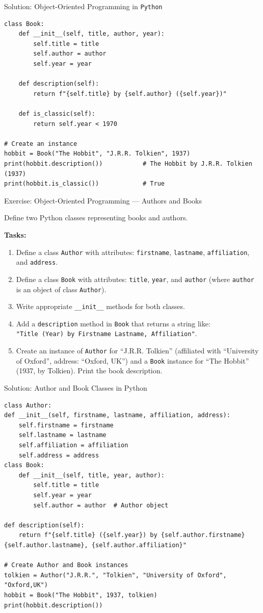 \documentclass[10pt]{beamer}
\begin{document}
\begin{frame}[fragile]{Solution: Object-Oriented Programming in \texttt{Python}}
\begin{lstlisting}[style=mypython]
class Book:
	def __init__(self, title, author, year):
		self.title = title
		self.author = author
		self.year = year

	def description(self):
		return f"{self.title} by {self.author} ({self.year})"

	def is_classic(self):
		return self.year < 1970

# Create an instance
hobbit = Book("The Hobbit", "J.R.R. Tolkien", 1937)
print(hobbit.description())           # The Hobbit by J.R.R. Tolkien (1937)
print(hobbit.is_classic())            # True
\end{lstlisting}
\end{frame}

\begin{frame}{Exercise: Object-Oriented Programming — Authors and Books}

Define two Python classes representing books and authors.

\textbf{Tasks:}
\begin{enumerate}
\item Define a class \texttt{Author} with attributes: \texttt{firstname}, \texttt{lastname}, \texttt{affiliation}, and \texttt{address}.
\item Define a class \texttt{Book} with attributes: \texttt{title}, \texttt{year}, and \texttt{author} (where \texttt{author} is an object of class \texttt{Author}).
\item Write appropriate \texttt{\_\_init\_\_} methods for both classes.
\item Add a \texttt{description} method in \texttt{Book} that returns a string like:\\
\texttt{"Title (Year) by Firstname Lastname, Affiliation"}.
\item Create an instance of \texttt{Author} for ``J.R.R. Tolkien'' (affiliated with ``University of Oxford'', address: ``Oxford, UK'') and a \texttt{Book} instance for ``The Hobbit'' (1937, by Tolkien). Print the book description.
\end{enumerate}
\end{frame}

\begin{frame}[fragile]{Solution: Author and Book Classes in Python}
\begin{lstlisting}[style=mypython]
class Author:
def __init__(self, firstname, lastname, affiliation, address):
	self.firstname = firstname
	self.lastname = lastname
	self.affiliation = affiliation
	self.address = address
class Book:
	def __init__(self, title, year, author):
		self.title = title
		self.year = year
		self.author = author  # Author object

def description(self):
	return f"{self.title} ({self.year}) by {self.author.firstname} {self.author.lastname}, {self.author.affiliation}"

# Create Author and Book instances
tolkien = Author("J.R.R.", "Tolkien", "University of Oxford", "Oxford,UK")
hobbit = Book("The Hobbit", 1937, tolkien)
print(hobbit.description())
\end{lstlisting}
\end{frame}
\end{document}
